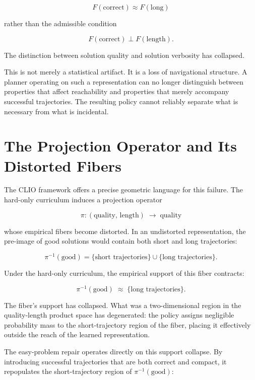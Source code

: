 \documentclass[11pt]{article}
\theoremstyle{rthm}
\theoremstyle{rdef}
\theoremstyle{remark}
\begin{document}
\[
F(\text{correct}) \approx F(\text{long})
\]

rather than the admissible condition

\[
F(\text{correct}) \perp F(\text{length}).
\]

The distinction between solution quality and solution verbosity has
collapsed.

This is not merely a statistical artifact. It is a loss of navigational
structure. A planner operating on such a representation can no longer
distinguish between properties that affect reachability and properties
that merely accompany successful trajectories. The resulting policy
cannot reliably separate what is necessary from what is incidental.

\section{The Projection Operator and Its Distorted Fibers}
\label{sec:projection}

The CLIO framework offers a precise geometric language for this
failure. The hard-only curriculum induces a projection operator

\[
\pi : (\text{quality},\, \text{length}) \;\longrightarrow\; \text{quality}
\]

whose empirical fibers become distorted. In an undistorted representation,
the pre-image of good solutions would contain both short and long
trajectories:

\[
\pi^{-1}(\text{good}) = \{\text{short trajectories}\} \cup \{\text{long trajectories}\}.
\]

Under the hard-only curriculum, the empirical support of this fiber
contracts:

\[
\pi^{-1}(\text{good}) \;\approx\; \{\text{long trajectories}\}.
\]

The fiber's support has collapsed. What was a two-dimensional region in
the quality-length product space has degenerated: the policy assigns
negligible probability mass to the short-trajectory region of the fiber,
placing it effectively outside the reach of the learned representation.

The easy-problem repair operates directly on this support collapse. By
introducing successful trajectories that are both correct and compact,
it repopulates the short-trajectory region of $\pi^{-1}(\text{good})$:
\end{document}
